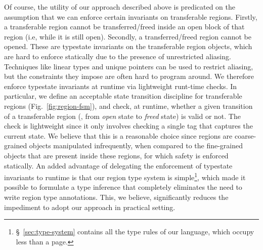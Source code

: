 Of course, the utility of our approach described above is predicated
on the assumption that we can enforce certain invariants on
transferable regions. Firstly, a transferable region cannot be
transferred/freed inside an open block of that region (i.e, while it
is still open).  Secondly, a transferred/freed region cannot be
opened. These are typestate invariants on the transferable region
objects, which are hard to enforce statically due to the presence of
unrestricted aliasing. Techniques like linear types and unique
pointers can be used to restrict aliasing, but the constraints they
impose are often hard to program around. We therefore enforce
typestate invariants at runtime via lightweight runt-time checks. In
particular, we define an acceptable state transition discipline for
transferable regions (Fig.~\ref{fig:region-fsm}), and check, at
runtime, whether a given transition of a transferable region (\eg,
from \emph{open} state to \emph{freed} state) is valid or not. The
check is lightweight since it only involves checking a single tag that
captures the current state.  We believe that this is a reasonable
choice since regions are coarse-grained objects manipulated
infrequently, when compared to the fine-grained objects that are
present inside these regions, for which safety is enforced statically.
An added advantage of delegating the enforcement of typestate
invariants to runtime is that our region type system is
simple\footnote{\S~\ref{sec:type-system} contains all the type rules
of our language, which occupy less than a page.}, which made it
possible to formulate a type inference that completely eliminates the
need to write region type annotations. This, we believe, significantly
reduces the impediment to adopt our approach in practical setting.



